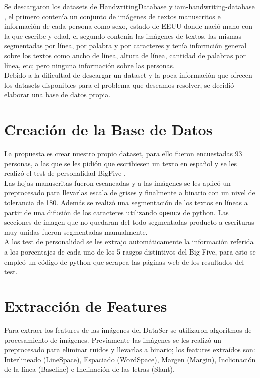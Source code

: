 \documentclass[10pt, a4paper]{article}
\begin{document}
        Se descargaron los datasets de HandwritingDatabase \cite{15} y iam-handwriting-database \cite{16}, el primero conten\'ia un conjunto de im\'agenes de textos manuscritos e informaci\'on de cada persona como sexo, estado de EEUU donde naci\'o 
        mano con la que escribe y edad, el segundo conten\'ia las im\'agenes de textos, las mismas segmentadas por l\'inea, por palabra y por caracteres y ten\'ia informci\'on general sobre los textos como 
        ancho de l\'inea, altura de l\'inea, cantidad de palabras por l\'inea, etc; pero ninguna informaci\'on sobre las personas. \\ 

        Debido a la dificultad de descargar un dataset y la poca informaci\'on que ofrecen los datasets disponibles para el problema que deseamos resolver, se decidi\'o elaborar una base de datos propia.

    \section{Creaci\'on de la Base de Datos}

        La propuesta es crear nuestro propio dataset, para ello fueron encuestadas 93 personas, a las que se les pidi\'on que escribiesen un texto 
        en espa\~nol y se les realiz\'o el test de personalidad BigFive \cite{23}. \\ 

        Las hojas manuscritas fueron escaneadas y a las im\'agenes se les aplic\'o un preprocesado para llevarlas escala de grises y finalmente a binario con un nivel de tolerancia de 180. Adem\'as se 
        realiz\'o una segmentaci\'on de los textos en l\'ineas a partir de una difusi\'on de los caracteres utilizando \texttt{opencv} de python. Las secciones de imagen que no quedaran 
        del todo segmentadas producto a escrituras muy unidas fueron segmentadas manualmente.\\ 

        A los test de personalidad se les extrajo autom\'aticamente la informaci\'on referida a los porcentajes de cada uno 
        de los 5 rasgos distintivos del Big Five, para esto se emple\'o un c\'odigo de python que scrapea las p\'aginas web de los resultados del test.\\ 

    \section{Extracci\'on de Features}
        Para extraer los features de las im\'agenes del DataSer se utilizaron algoritmos de procesamiento de im\'agenes. Previamente las im\'agenes se les realiz\'o un 
        preprocesado para eliminar ruidos y llevarlas a binario; los features extra\'idos son: Interlineado (LineSpace), Espaciado (WordSpace), Margen (Margin), Inclionaci\'on de la l\'inea (Baseline) e Inclinaci\'on de las letras (Slant). 
\end{document}
